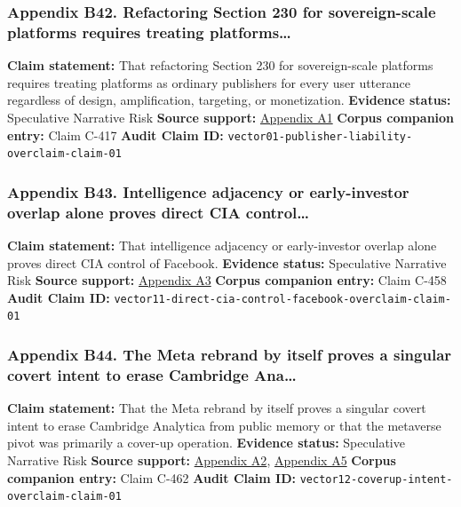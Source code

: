 \documentclass[
  american,
  11pt,
  letterpaper,
]{article}
\begin{document}
\subsubsection{Appendix B42. Refactoring Section 230 for sovereign-scale
platforms requires treating
platforms\ldots{}}\label{appendix-b42-refactoring-section-230-for-sovereign-scale-platforms-requires-treating-platforms}

\textbf{Claim statement:} That refactoring Section 230 for
sovereign-scale platforms requires treating platforms as ordinary
publishers for every user utterance regardless of design, amplification,
targeting, or monetization. \textbf{Evidence status:} Speculative
Narrative Risk \textbf{Source support:}
\hyperref[appendix-a1-a-look-behind-the-screens-examining-the-data-practices-of-social-media-and-video-streaming-services]{Appendix
A1} \textbf{Corpus companion entry:} Claim C-417 \textbf{Audit Claim
ID:} \texttt{vector01-publisher-liability-overclaim-claim-01}

\subsubsection{Appendix B43. Intelligence adjacency or early-investor
overlap alone proves direct CIA
control\ldots{}}\label{appendix-b43-intelligence-adjacency-or-early-investor-overlap-alone-proves-direct-cia-control}

\textbf{Claim statement:} That intelligence adjacency or early-investor
overlap alone proves direct CIA control of Facebook. \textbf{Evidence
status:} Speculative Narrative Risk \textbf{Source support:}
\hyperref[appendix-a3-facebook-inc-registration-statement-on-form-s-1]{Appendix
A3} \textbf{Corpus companion entry:} Claim C-458 \textbf{Audit Claim
ID:} \texttt{vector11-direct-cia-control-facebook-overclaim-claim-01}

\subsubsection{Appendix B44. The Meta rebrand by itself proves a
singular covert intent to erase Cambridge
Ana\ldots{}}\label{appendix-b44-the-meta-rebrand-by-itself-proves-a-singular-covert-intent-to-erase-cambridge-ana}

\textbf{Claim statement:} That the Meta rebrand by itself proves a
singular covert intent to erase Cambridge Analytica from public memory
or that the metaverse pivot was primarily a cover-up operation.
\textbf{Evidence status:} Speculative Narrative Risk \textbf{Source
support:}
\hyperref[appendix-a2-ftc-imposes-5-billion-penalty-and-sweeping-new-privacy-restrictions-on-facebook]{Appendix
A2}, \hyperref[appendix-a5-the-facebook-company-is-now-meta]{Appendix
A5} \textbf{Corpus companion entry:} Claim C-462 \textbf{Audit Claim
ID:} \texttt{vector12-coverup-intent-overclaim-claim-01}
\end{document}
